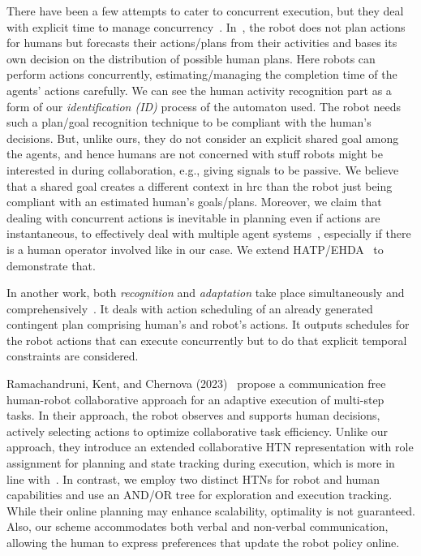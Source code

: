 There have been a few attempts to cater to concurrent execution, but they deal with explicit time to manage concurrency~\cite{CirilloKS09a,kockemann2014grandpa}. 
In~\cite{CirilloKS09}, the robot does not plan actions for humans but forecasts their actions/plans from their activities and bases its own decision on the distribution of possible human plans. Here robots can perform actions concurrently, estimating/managing the completion time of the agents' actions carefully. 
We can see the human activity recognition part as a form of our \textit{identification (ID)} process of the automaton used. The robot needs such a plan/goal recognition technique to be compliant with the human's decisions. 
But, unlike ours, they do not consider an explicit shared goal among the agents, and hence humans are not concerned with stuff robots might be interested in during collaboration, e.g., giving signals to be passive. 
We believe that a shared goal creates a different context in \acrshort{hrc} than the robot just being compliant with an estimated human's goals/plans. 
Moreover, we claim that dealing with concurrent actions is inevitable in planning even if actions are instantaneous, to effectively deal with multiple agent systems~\cite{CrosbyJR14,ShekharB20}, especially if there is a human operator involved like in our case. 
We extend HATP/EHDA~\cite{buisan_hatpehda_icra} to demonstrate that.

In another work, both \textit{recognition} and \textit{adaptation} take place simultaneously and comprehensively~\cite{levine2014concurrent}. 
It deals with action scheduling of an already generated contingent plan comprising human's and robot's actions. 
It outputs schedules for the robot actions that can execute concurrently but to do that explicit temporal constraints are considered. 

Ramachandruni, Kent, and Chernova (2023)~\cite{RAMACHANDRUNI2023} propose a communication free human-robot collaborative approach for an adaptive execution of multi-step tasks. 
In their approach, the robot observes and supports human decisions, actively selecting actions to optimize collaborative task efficiency. 
Unlike our approach, they introduce an extended collaborative HTN representation with role assignment for planning and state tracking during execution, which is more in line with~\cite{roncone2017transparent}. 
In contrast, we employ two distinct HTNs for robot and human capabilities and use an AND/OR tree for exploration and execution tracking. While their online planning may enhance scalability, optimality is not guaranteed. 
Also, our scheme accommodates both verbal and non-verbal communication, allowing the human to express preferences that update the robot policy online. 

